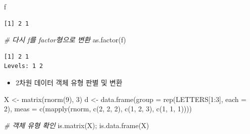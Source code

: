 \documentclass[
  11pt,
]{krantz}
\newenvironment{Shaded}{\begin{snugshade}}{\end{snugshade}}
\newcommand{\AttributeTok}[1]{\textcolor[rgb]{0.61,0.61,0.61}{#1}}
\newcommand{\CommentTok}[1]{\textcolor[rgb]{0.37,0.37,0.37}{\textit{#1}}}
\newcommand{\DecValTok}[1]{\textcolor[rgb]{0.06,0.06,0.06}{#1}}
\newcommand{\FunctionTok}[1]{\textcolor[rgb]{0,0,0}{#1}}
\newcommand{\NormalTok}[1]{#1}
\newcommand{\OtherTok}[1]{\textcolor[rgb]{0.37,0.37,0.37}{#1}}
\newcommand{\SpecialCharTok}[1]{\textcolor[rgb]{0,0,0}{#1}}
\providecommand{\tightlist}{%
  \setlength{\itemsep}{0pt}\setlength{\parskip}{0pt}}
\begin{document}
\begin{Shaded}
\begin{Highlighting}[]
\NormalTok{f}
\end{Highlighting}
\end{Shaded}

\begin{verbatim}
[1] 2 1
\end{verbatim}

\begin{Shaded}
\begin{Highlighting}[]
\CommentTok{\# 다시 f를 factor형으로 변환}
\FunctionTok{as.factor}\NormalTok{(f)}
\end{Highlighting}
\end{Shaded}

\begin{verbatim}
[1] 2 1
Levels: 1 2
\end{verbatim}

\normalsize

\begin{itemize}
\tightlist
\item
  2차원 데이터 객체 유형 판별 및 변환
\end{itemize}

\footnotesize

\begin{Shaded}
\begin{Highlighting}[]
\NormalTok{X }\OtherTok{\textless{}{-}} \FunctionTok{matrix}\NormalTok{(}\FunctionTok{rnorm}\NormalTok{(}\DecValTok{9}\NormalTok{), }\DecValTok{3}\NormalTok{)}
\NormalTok{d }\OtherTok{\textless{}{-}} \FunctionTok{data.frame}\NormalTok{(}\AttributeTok{group =} \FunctionTok{rep}\NormalTok{(LETTERS[}\DecValTok{1}\SpecialCharTok{:}\DecValTok{3}\NormalTok{], }\AttributeTok{each =} \DecValTok{2}\NormalTok{), }
                \AttributeTok{meas =} \FunctionTok{c}\NormalTok{(}\FunctionTok{mapply}\NormalTok{(rnorm, }
                                \FunctionTok{c}\NormalTok{(}\DecValTok{2}\NormalTok{, }\DecValTok{2}\NormalTok{, }\DecValTok{2}\NormalTok{),}
                                \FunctionTok{c}\NormalTok{(}\DecValTok{1}\NormalTok{, }\DecValTok{2}\NormalTok{, }\DecValTok{3}\NormalTok{), }
                                \FunctionTok{c}\NormalTok{(}\DecValTok{1}\NormalTok{, }\DecValTok{1}\NormalTok{, }\DecValTok{1}\NormalTok{))))}

\CommentTok{\# 객체 유형 확인}
\FunctionTok{is.matrix}\NormalTok{(X); }\FunctionTok{is.data.frame}\NormalTok{(X)}
\end{Highlighting}
\end{Shaded}
\end{document}
